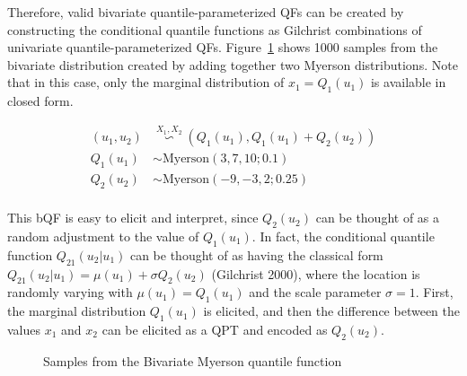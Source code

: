 \documentclass[
]{interact}
\begin{document}
Therefore, valid bivariate quantile-parameterized QFs can be created by
constructing the conditional quantile functions as Gilchrist
combinations of univariate quantile-parameterized QFs.
Figure~\ref{fig-bq-myerson} shows 1000 samples from the bivariate
distribution created by adding together two Myerson distributions. Note
that in this case, only the marginal distribution of \(x_1 = Q_1(u_1)\)
is available in closed form.

\[
\begin{aligned}
(u_1, u_2) &\overset{X_1, X_2}{\backsim} (Q_1(u_1), Q_1(u_1)+Q_2(u_2))\\
Q_1(u_1) &\sim\text{Myerson}(3,7,10; 0.1)\\
Q_2(u_2) &\sim \text{Myerson}(-9, -3, 2; 0.25)\\
\end{aligned}
\]

This bQF is easy to elicit and interpret, since \(Q_2(u_2)\) can be
thought of as a random adjustment to the value of \(Q_1(u_1)\). In fact,
the conditional quantile function \(Q_{21}(u_2\vert u_1)\) can be
thought of as having the classical form
\(Q_{21}(u_2\vert u_1) = \mu(u_1) + \sigma Q_2(u_2)\) (Gilchrist 2000),
where the location is randomly varying with \(\mu(u_1) = Q_1(u_1)\) and
the scale parameter \(\sigma = 1\). First, the marginal distribution
\(Q_1(u_1)\) is elicited, and then the difference between the values
\(x_1\) and \(x_2\) can be elicited as a QPT and encoded as
\(Q_2(u_2)\).

\begin{figure}


\caption{\label{fig-bq-myerson}Samples from the Bivariate Myerson
quantile function}

\end{figure}%
\end{document}
